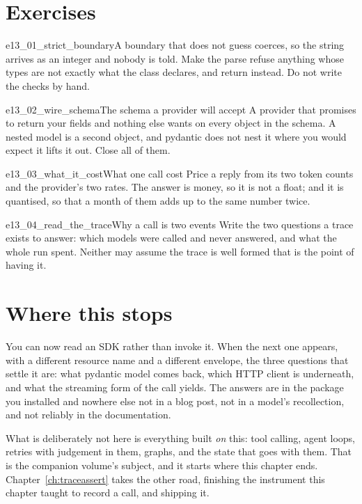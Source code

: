 \section{Exercises}
\label{sec:ai-exercises}

\begin{exercise}{e13_01_strict_boundary}{A boundary that does not guess}
 coerces, so the string  arrives as an integer and
nobody is told. Make the parse refuse anything whose types are not exactly
what the class declares, and return  instead. Do not write the
checks by hand.
\end{exercise}

\begin{exercise}{e13_02_wire_schema}{The schema a provider will accept}
A provider that promises to return your fields and nothing else wants
 on every object in the schema. A nested
model is a second object, and pydantic does not nest it where you would
expect \dash{} it lifts it out. Close all of them.
\end{exercise}

\begin{exercise}{e13_03_what_it_cost}{What one call cost}
\label{ex:ch13-cost}
Price a reply from its two token counts and the provider's two rates. The
answer is money, so it is not a float; and it is quantised, so that a month
of them adds up to the same number twice.
\end{exercise}

\begin{exercise}{e13_04_read_the_trace}{Why a call is two events}
Write the two questions a trace exists to answer: which models were called
and never answered, and what the whole run spent. Neither may assume the
trace is well formed \dash{} that is the point of having it.
\end{exercise}

\section{Where this stops}
\label{sec:ai-stops}

You can now read an SDK rather than invoke it. When the next one appears,
with a different resource name and a different envelope, the three questions
that settle it are: what pydantic model comes back, which HTTP client is
underneath, and what the streaming form of the call yields. The answers are
in the package you installed and nowhere else \dash{} not in a blog post,
not in a model's recollection, and not reliably in the documentation.

What is deliberately not here is everything built \emph{on} this: tool
calling, agent loops, retries with judgement in them, graphs, and the state
that goes with them. That is the companion volume's subject, and it starts
where this chapter ends. Chapter~\ref{ch:traceassert} takes the other road,
finishing the instrument this chapter taught to record a call, and shipping
it.
